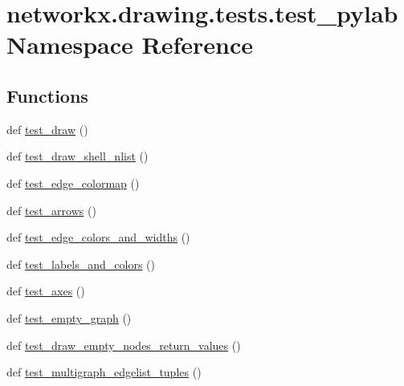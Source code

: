 \hypertarget{namespacenetworkx_1_1drawing_1_1tests_1_1test__pylab}{}\section{networkx.\+drawing.\+tests.\+test\+\_\+pylab Namespace Reference}
\label{namespacenetworkx_1_1drawing_1_1tests_1_1test__pylab}
\subsection*{Functions}
\begin{DoxyCompactItemize}
\item 
def \hyperlink{namespacenetworkx_1_1drawing_1_1tests_1_1test__pylab_a2cfc3dbcad0ae890670af7c9316ac3f5}{test\+\_\+draw} ()
\item 
def \hyperlink{namespacenetworkx_1_1drawing_1_1tests_1_1test__pylab_a05c6027a8a17c4551d949529709d3bf7}{test\+\_\+draw\+\_\+shell\+\_\+nlist} ()
\item 
def \hyperlink{namespacenetworkx_1_1drawing_1_1tests_1_1test__pylab_a2278b647431bb250f87d99b6aa620479}{test\+\_\+edge\+\_\+colormap} ()
\item 
def \hyperlink{namespacenetworkx_1_1drawing_1_1tests_1_1test__pylab_abfade40213ed392a2ce64aca785efbfe}{test\+\_\+arrows} ()
\item 
def \hyperlink{namespacenetworkx_1_1drawing_1_1tests_1_1test__pylab_a3729c62f37eef19f8f7e8782418125d3}{test\+\_\+edge\+\_\+colors\+\_\+and\+\_\+widths} ()
\item 
def \hyperlink{namespacenetworkx_1_1drawing_1_1tests_1_1test__pylab_a805c5bce090de499e4212f7a9bd96458}{test\+\_\+labels\+\_\+and\+\_\+colors} ()
\item 
def \hyperlink{namespacenetworkx_1_1drawing_1_1tests_1_1test__pylab_a073c14a79c3397b79d918cbea37f744c}{test\+\_\+axes} ()
\item 
def \hyperlink{namespacenetworkx_1_1drawing_1_1tests_1_1test__pylab_a3172b2eb87f5c94e3b3cdf95f8df9e96}{test\+\_\+empty\+\_\+graph} ()
\item 
def \hyperlink{namespacenetworkx_1_1drawing_1_1tests_1_1test__pylab_a9a4bf05f1312609719b95cdbbd7b848a}{test\+\_\+draw\+\_\+empty\+\_\+nodes\+\_\+return\+\_\+values} ()
\item 
def \hyperlink{namespacenetworkx_1_1drawing_1_1tests_1_1test__pylab_a6fb184ad9b47a779012a78e00e878442}{test\+\_\+multigraph\+\_\+edgelist\+\_\+tuples} ()
\item 

\end{DoxyCompactItemize}
